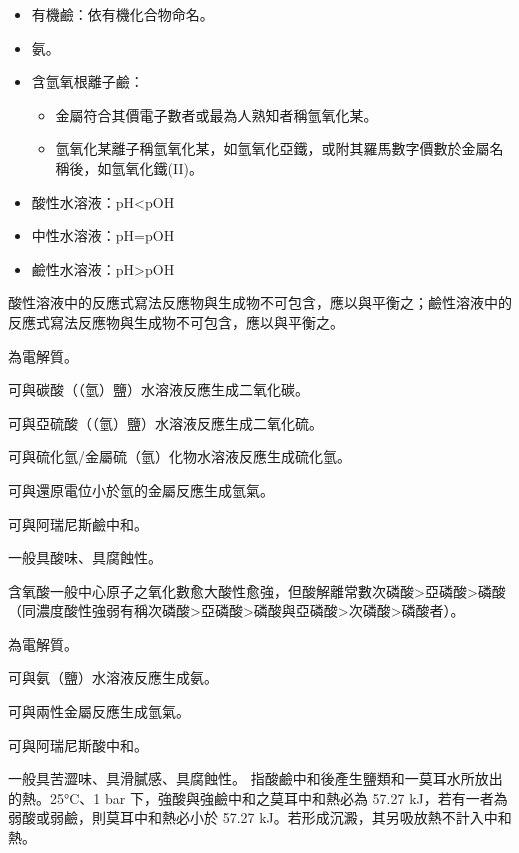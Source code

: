 \documentclass[a4paper,12pt]{article}
\begin{document}
\begin{itemize}
\item 有機鹼：依有機化合物命名。
\item 氨。
\item 含氫氧根離子鹼：
\begin{itemize}
\item 金屬符合其價電子數者或最為人熟知者稱氫氧化某。
\item 氫氧化某離子稱氫氧化某，如氫氧化亞鐵，或附其羅馬數字價數於金屬名稱後，如氫氧化鐵(II)。
\end{itemize}
\end{itemize}
\begin{itemize}
\item 酸性水溶液：pH<pOH
\item 中性水溶液：pH=pOH
\item 鹼性水溶液：pH>pOH
\end{itemize}
酸性溶液中的反應式寫法反應物與生成物不可包含，應以與平衡之；鹼性溶液中的反應式寫法反應物與生成物不可包含，應以與平衡之。
\bit
\item 為電解質。
\item 可與碳酸（（氫）鹽）水溶液反應生成二氧化碳。
\item 可與亞硫酸（（氫）鹽）水溶液反應生成二氧化硫。
\item 可與硫化氫/金屬硫（氫）化物水溶液反應生成硫化氫。
\item 可與還原電位小於氫的金屬反應生成氫氣。
\item 可與阿瑞尼斯鹼中和。
\item 一般具酸味、具腐蝕性。
\item 含氧酸一般中心原子之氧化數愈大酸性愈強，但酸解離常數次磷酸>亞磷酸>磷酸（同濃度酸性強弱有稱次磷酸>亞磷酸>磷酸與亞磷酸>次磷酸>磷酸者）。
\eit
{}
\bit
\item 為電解質。
\item 可與氨（鹽）水溶液反應生成氨。
\item 可與兩性金屬反應生成氫氣。
\item 可與阿瑞尼斯酸中和。
\item 一般具苦澀味、具滑膩感、具腐蝕性。
\eit
{}
指酸鹼中和後產生鹽類和一莫耳水所放出的熱。25°C、1 bar 下，強酸與強鹼中和之莫耳中和熱必為 57.27 kJ，若有一者為弱酸或弱鹼，則莫耳中和熱必小於 57.27 kJ。若形成沉澱，其另吸放熱不計入中和熱。
\end{document}
